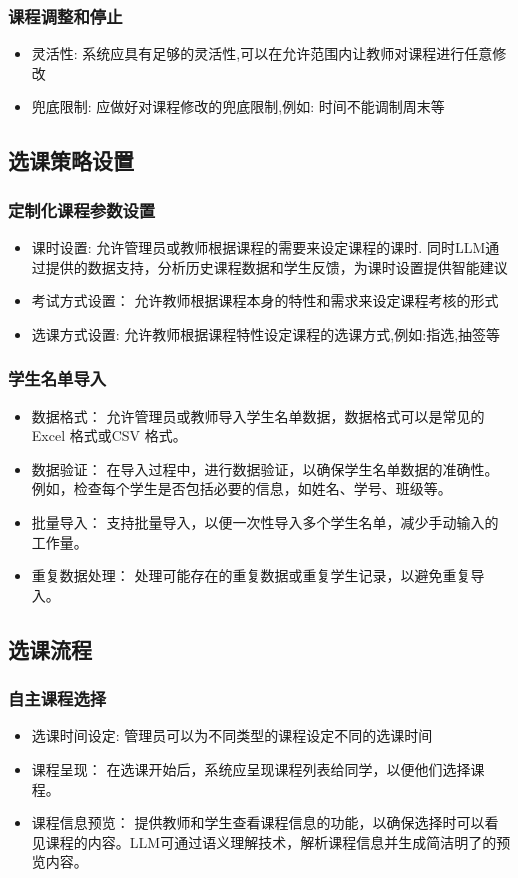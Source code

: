 \documentclass{article}
\begin{document}
\subsubsection{课程调整和停止}
\begin{itemize}
  \item 灵活性: 系统应具有足够的灵活性,可以在允许范围内让教师对课程进行任意修改
  \item 兜底限制: 应做好对课程修改的兜底限制,例如: 时间不能调制周末等
\end{itemize}

\subsection{选课策略设置}
\subsubsection{定制化课程参数设置}
\begin{itemize}
  \item 课时设置: 允许管理员或教师根据课程的需要来设定课程的课时. 同时LLM通过提供的数据支持，分析历史课程数据和学生反馈，为课时设置提供智能建议
  \item 考试方式设置： 允许教师根据课程本身的特性和需求来设定课程考核的形式
  \item 选课方式设置: 允许教师根据课程特性设定课程的选课方式,例如:指选,抽签等
\end{itemize}
\subsubsection{学生名单导入}
\begin{itemize}
  \item 数据格式： 允许管理员或教师导入学生名单数据，数据格式可以是常见的 Excel 格式或CSV 格式。
  \item 数据验证： 在导入过程中，进行数据验证，以确保学生名单数据的准确性。例如，检查每个学生是否包括必要的信息，如姓名、学号、班级等。
  \item 批量导入： 支持批量导入，以便一次性导入多个学生名单，减少手动输入的工作量。
  \item 重复数据处理： 处理可能存在的重复数据或重复学生记录，以避免重复导入。
\end{itemize}

\subsection{选课流程}
\subsubsection{自主课程选择}
\begin{itemize}
  \item 选课时间设定: 管理员可以为不同类型的课程设定不同的选课时间
  \item 课程呈现： 在选课开始后，系统应呈现课程列表给同学，以便他们选择课程。
  \item 课程信息预览： 提供教师和学生查看课程信息的功能，以确保选择时可以看见课程的内容。LLM可通过语义理解技术，解析课程信息并生成简洁明了的预览内容。
\end{itemize}
\end{document}
